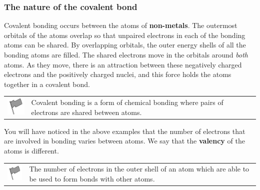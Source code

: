             \subsubsection{ The nature of the covalent bond}
            \nopagebreak
        \label{m38704*id138956}Covalent bonding occurs between the atoms of \textbf{non-metals}. The outermost orbitals of the atoms overlap so that unpaired electrons in each of the bonding atoms can be shared. By overlapping orbitals, the outer energy shells of all the bonding atoms are filled. The shared electrons move in the orbitals around \textsl{both} atoms. As they move, there is an attraction between these negatively charged electrons and the positively charged nuclei, and this force holds the atoms together in a covalent bond.\par 
\label{m38704*fhsst!!!underscore!!!id94}\begin{definition}
	  \begin{tabular*}{15 cm}{m{15 mm}m{}}
	\hspace*{-50pt}  \includegraphics[width=0.5in]{col11305.imgs/psflag2.png}   & \Definition{   \label{id2427171}\textbf{ Covalent bond }} { \label{m38704*meaningfhsst!!!underscore!!!id94}
        Covalent bonding is a form of chemical bonding where pairs of electrons are shared between atoms. 
         } 
      \end{tabular*}
      \end{definition}
        \label{m38704*id139505}You will have noticed in the above examples that the number of electrons that are involved in bonding varies between atoms. We say that the \textbf{valency} of the atoms is different.\par 
\label{m38704*fhsst!!!underscore!!!id165}\begin{definition}
	  \begin{tabular*}{15 cm}{m{15 mm}m{}}
	\hspace*{-50pt}  \includegraphics[width=0.5in]{col11305.imgs/psflag2.png}   & \Definition{   \label{id2427205}\textbf{ Valency }} { \label{m38704*meaningfhsst!!!underscore!!!id165}
        The number of electrons in the outer shell of an atom which are able to be used to form bonds with other atoms. 
         } 
      \end{tabular*}
      \end{definition}
